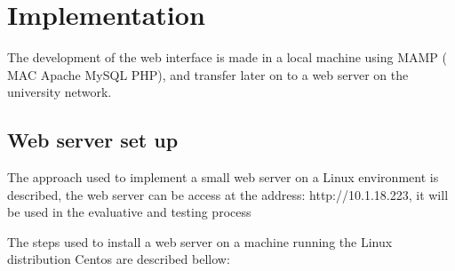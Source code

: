 \section{Implementation}
The development of the web interface is made in a local machine using MAMP ( MAC Apache MySQL PHP), and transfer later on to a web server on the university network. 

\subsection{Web server set up}
The approach used to implement a small web server on a Linux environment is described, the web server can be access at the address: http://10.1.18.223, it will be used in the evaluative and testing process

The steps used to install a web server on a machine running the Linux distribution Centos are described bellow:
